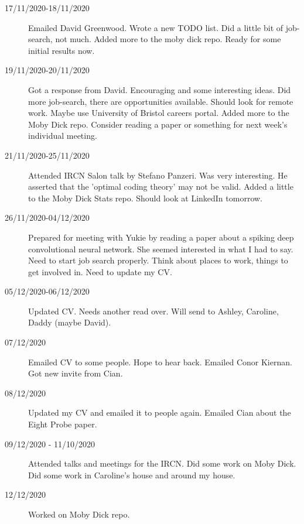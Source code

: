 \documentclass[a4paper,12pt]{article}
\theoremstyle{definition}
\begin{document}
\begin{description}
	\item[17/11/2020-18/11/2020] Emailed David Greenwood. Wrote a new TODO list. Did a little bit of job-search, not much. Added more to the moby dick repo. Ready for some initial results now.

	\item[19/11/2020-20/11/2020] Got a response from David. Encouraging and some interesting ideas. Did more job-search, there are opportunities available. Should look for remote work. Maybe use University of Bristol careers portal. Added more to the Moby Dick repo. Consider reading a paper or something for next week's individual meeting.

	\item[21/11/2020-25/11/2020] Attended IRCN Salon talk by Stefano Panzeri. Was very interesting. He asserted that the 'optimal coding theory' may not be valid. Added a little to the Moby Dick Stats repo. Should look at LinkedIn tomorrow.

	\item[26/11/2020-04/12/2020] Prepared for meeting with Yukie by reading a paper about a spiking deep convolutional neural network. She seemed interested in what I had to say. Need to start job search properly. Think about places to work, things to get involved in. Need to update my CV.

	\item[05/12/2020-06/12/2020] Updated CV. Needs another read over. Will send to Ashley, Caroline, Daddy (maybe David).

	\item[07/12/2020] Emailed CV to some people. Hope to hear back. Emailed Conor Kiernan. Got new invite from Cian.

	\item[08/12/2020] Updated my CV and emailed it to people again. Emailed Cian about the Eight Probe paper.

	\item[09/12/2020 - 11/10/2020] Attended talks and meetings for the IRCN. Did some work on Moby Dick. Did some work in Caroline's house and around my house.

	\item[12/12/2020] Worked on Moby Dick repo.

\end{description}
\end{document}
